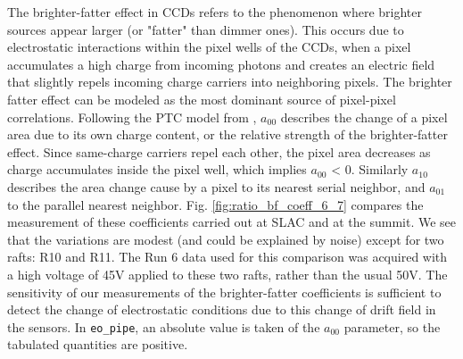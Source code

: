 The brighter-fatter effect in CCDs refers to the phenomenon where brighter sources appear larger (or "fatter" than dimmer ones). This occurs due to electrostatic interactions within the pixel wells of the CCDs, when a pixel accumulates a high charge from incoming photons and creates an electric field that slightly repels incoming charge carriers into neighboring pixels. The brighter fatter effect can be modeled as the most dominant source of pixel-pixel correlations. Following the PTC model from  
\citet{2019A&A...629A..36A}, $a_{00}$ describes the change of a pixel area due to its own charge content, or the relative strength of the brighter-fatter effect. Since same-charge carriers repel each other, the pixel area decreases as charge accumulates inside the pixel well, which implies $a_{00}$ \textless{} 0. Similarly $a_{10}$ describes the area change cause by a pixel to its nearest serial neighbor, and $a_{01}$ to the parallel nearest neighbor. Fig. \ref{fig:ratio_bf_coeff_6_7} compares the measurement of these coefficients carried out at SLAC and at the summit. We see that the variations are modest (and could be explained by noise) except for two rafts: R10 and R11. The Run 6 data used for this comparison was acquired with a high voltage of 45V applied to these two rafts, rather than the usual 50V. The sensitivity of our measurements of the brighter-fatter coefficients is sufficient to detect the change of electrostatic conditions due to this change of drift field in the sensors. In {\tt eo\_pipe}, an absolute value is taken of the $a_{00}$ parameter, so the tabulated quantities are positive.

